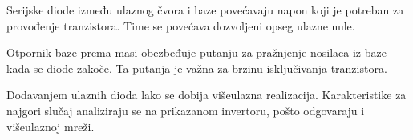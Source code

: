 Serijske diode između ulaznog čvora i baze povećavaju napon koji je potreban za provođenje tranzistora. Time se povećava dozvoljeni opseg ulazne nule.

Otpornik baze prema masi obezbeđuje putanju za pražnjenje nosilaca iz baze kada se diode zakoče. Ta putanja je važna za brzinu isključivanja tranzistora.

Dodavanjem ulaznih dioda lako se dobija višeulazna realizacija. Karakteristike za najgori slučaj analiziraju se na prikazanom invertoru, pošto odgovaraju i višeulaznoj mreži.
